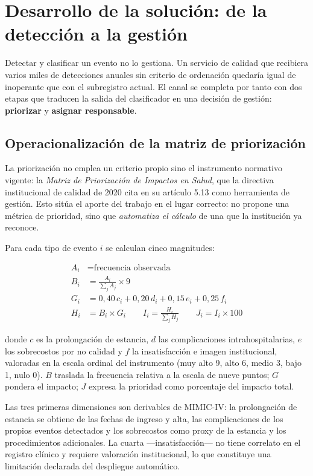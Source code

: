 \documentclass[conference]{IEEEtran}
\begin{document}
\section{Desarrollo de la solución: de la detección a la gestión}
\label{sec:gemses}

Detectar y clasificar un evento no lo gestiona. Un servicio de calidad que
recibiera varios miles de detecciones anuales sin criterio de ordenación
quedaría igual de inoperante que con el subregistro actual. El canal se
completa por tanto con dos etapas que traducen la salida del clasificador en
una decisión de gestión: \textbf{priorizar} y \textbf{asignar responsable}.

\subsection{Operacionalización de la matriz de priorización}
La priorización no emplea un criterio propio sino el instrumento normativo
vigente: la \emph{Matriz de Priorización de Impactos en Salud}, que la
directiva institucional de calidad de 2020 cita en su artículo 5.13 como herramienta de
gestión. Esto sitúa el aporte del trabajo en el lugar correcto: no propone una
métrica de prioridad, sino que \emph{automatiza el cálculo} de una que la
institución ya reconoce.

Para cada tipo de evento $i$ se calculan cinco magnitudes:

\begin{align}
A_i &= \text{frecuencia observada} \\
B_i &= \frac{A_i}{\sum_j A_j} \times 9 \\
G_i &= 0{,}40\,c_i + 0{,}20\,d_i + 0{,}15\,e_i + 0{,}25\,f_i \\
H_i &= B_i \times G_i \qquad
I_i = \frac{H_i}{\sum_j H_j} \qquad
J_i = I_i \times 100
\end{align}

\noindent donde $c$ es la prolongación de estancia, $d$ las complicaciones
intrahospitalarias, $e$ los sobrecostos por no calidad y $f$ la insatisfacción
e imagen institucional, valoradas en la escala ordinal del instrumento
(muy alto 9, alto 6, medio 3, bajo 1, nulo 0). $B$ traslada la frecuencia
relativa a la escala de nueve puntos; $G$ pondera el impacto; $J$ expresa la
prioridad como porcentaje del impacto total.

Las tres primeras dimensiones son derivables de MIMIC-IV: la prolongación de
estancia se obtiene de las fechas de ingreso y alta, las complicaciones de los
propios eventos detectados y los sobrecostos como proxy de la estancia y los
procedimientos adicionales. La cuarta ---insatisfacción--- no tiene
correlato en el registro clínico y requiere valoración institucional, lo que
constituye una limitación declarada del despliegue automático.
\end{document}
